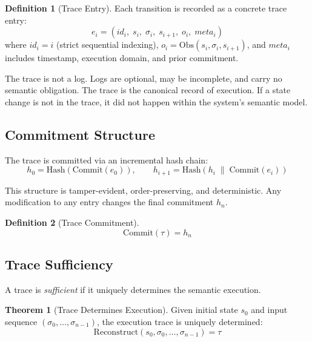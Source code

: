 \documentclass[11pt,a4paper]{article}
\theoremstyle{definition}
\newtheorem{definition}{Definition}[section]
\newtheorem{theorem}{Theorem}[section]
\newcommand{\Obs}{\mathrm{Obs}}
\newcommand{\Commit}{\mathrm{Commit}}
\newcommand{\Hash}{\mathrm{Hash}}
\newcommand{\Reconstruct}{\mathrm{Reconstruct}}
\begin{document}
\begin{definition}[Trace Entry]
\label{def:trace-entry}
Each transition is recorded as a concrete trace entry:
\begin{equation}
e_i = (\mathit{id}_i,\; s_i,\; \sigma_i,\; s_{i+1},\; o_i,\; \mathit{meta}_i)
\end{equation}
where $\mathit{id}_i = i$ (strict sequential indexing), $o_i = \Obs(s_i, \sigma_i, s_{i+1})$, and $\mathit{meta}_i$ includes timestamp, execution domain, and prior commitment.
\end{definition}

The trace is not a log. Logs are optional, may be incomplete, and carry no semantic obligation. The trace is the canonical record of execution. If a state change is not in the trace, it did not happen within the system's semantic model.

\subsection{Commitment Structure}
\label{subsec:commitment}

The trace is committed via an incremental hash chain:
\begin{equation}
\label{eq:hash-chain}
h_0 = \Hash(\Commit(e_0)), \qquad h_{i+1} = \Hash(h_i \;\|\; \Commit(e_i))
\end{equation}

This structure is tamper-evident, order-preserving, and deterministic. Any modification to any entry changes the final commitment $h_n$.

\begin{definition}[Trace Commitment]
\label{def:trace-commitment}
\begin{equation}
\Commit(\tau) = h_n
\end{equation}
\end{definition}

\subsection{Trace Sufficiency}
\label{subsec:trace-sufficiency}

A trace is \emph{sufficient} if it uniquely determines the semantic execution.

\begin{theorem}[Trace Determines Execution]
\label{thm:trace-determines}
Given initial state $s_0$ and input sequence $(\sigma_0, \ldots, \sigma_{n-1})$, the execution trace is uniquely determined:
\begin{equation}
\Reconstruct(s_0, \sigma_0, \ldots, \sigma_{n-1}) = \tau
\end{equation}
\end{theorem}
\end{document}
